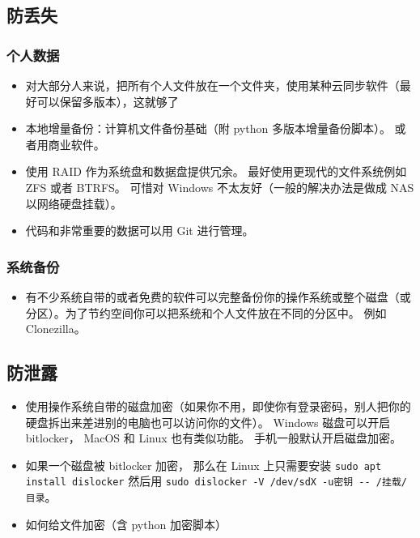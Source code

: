
\begin{issues}
\issueDraft
\end{issues}

\subsection{防丢失}
\subsubsection{个人数据}
\begin{itemize}
\item 对大部分人来说，把所有个人文件放在一个文件夹，使用某种云同步软件（最好可以保留多版本），这就够了
\item 本地增量备份：计算机文件备份基础（附 python 多版本增量备份脚本）。 或者用商业软件。
\item 使用 RAID 作为系统盘和数据盘提供冗余。 最好使用更现代的文件系统例如 ZFS 或者 BTRFS。 可惜对 Windows 不太友好（一般的解决办法是做成 NAS 以网络硬盘挂载）。
\item 代码和非常重要的数据可以用 Git 进行管理。
\end{itemize}

\subsubsection{系统备份}
\begin{itemize}
\item 有不少系统自带的或者免费的软件可以完整备份你的操作系统或整个磁盘（或分区）。为了节约空间你可以把系统和个人文件放在不同的分区中。 例如 Clonezilla。
\end{itemize}

\subsection{防泄露}
\begin{itemize}
\item 使用操作系统自带的磁盘加密（如果你不用，即使你有登录密码，别人把你的硬盘拆出来差进别的电脑也可以访问你的文件）。 Windows 磁盘可以开启 bitlocker， MacOS 和 Linux 也有类似功能。 手机一般默认开启磁盘加密。
\item 如果一个磁盘被 bitlocker 加密， 那么在 Linux 上只需要安装 \verb`sudo apt install dislocker` 然后用 \verb`sudo dislocker -V /dev/sdX -u密钥 -- /挂载/目录`。 
\item 如何给文件加密（含 python 加密脚本）
\end{itemize}
